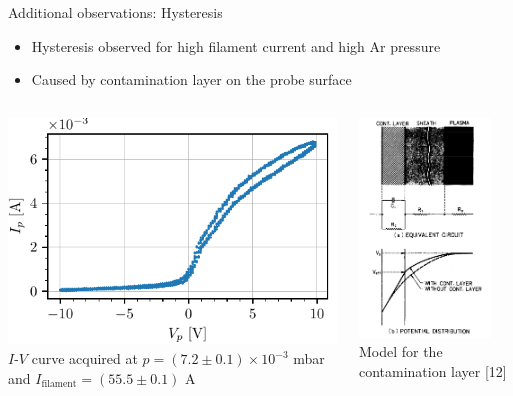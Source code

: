 \documentclass[10pt]{beamer}
\newcommand{\filamentcurrent}{\ensuremath{I_{\mathrm{filament}}}}
\begin{document}
\begin{frame}{Additional observations: Hysteresis}
    \begin{itemize}
        \item Hysteresis observed for high filament current and high Ar pressure
        \item Caused by contamination layer on the probe surface\,  
    \end{itemize}
    \vspace{-0.5cm}
    \begin{columns}[b]
        \begin{center}
            \includegraphics[scale=1]{../figures/hysteresis.pdf}\\
            \small $I$-$V$ curve acquired at $p = (7.2 \pm 0.1) \times 10^{-3}$ mbar and $\filamentcurrent = (55.5 \pm 0.1)$ A
        \end{center}

        \begin{center}
            \includegraphics[width=3.5cm]{../figures/contamination_layer.png}\\
            \small Model for the contamination layer [12]
        \end{center}
        
    \end{columns}

\end{frame}
\end{document}
